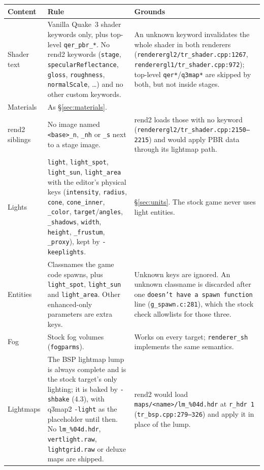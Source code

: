 \documentclass[11pt,a4paper]{article}
\begin{document}
\begin{tabular}{@{}p{}p{}p{}@{}}
\toprule
Content & Rule & Grounds \\
\midrule
Shader text & Vanilla Quake~3 shader keywords only, plus top-level \texttt{qer\_pbr\_*}. No rend2
  keywords (\texttt{stage}, \texttt{specularReflectance}, \texttt{gloss}, \texttt{roughness},
  \texttt{normalScale}, \ldots) and no other custom keywords. &
  An unknown keyword invalidates the whole shader in both renderers (\texttt{renderergl2/tr\_shader.cpp:1267},
  \texttt{renderergl1/tr\_shader.cpp:972}); top-level \texttt{qer*}/\texttt{q3map*} are skipped by
  both, but not inside stages. \\
Materials & As §\ref{sec:materials}. & \\
rend2 siblings & No image named \texttt{<base>\_n}, \texttt{\_nh} or \texttt{\_s} next to a stage
  image. &
  rend2 loads those with no keyword (\texttt{renderergl2/tr\_shader.cpp:2150--2215}) and would
  apply PBR data through its lightmap path. \\
Lights & \texttt{light}, \texttt{light\_spot}, \texttt{light\_sun}, \texttt{light\_area} with the
  editor's physical keys (\texttt{intensity}, \texttt{radius}, \texttt{cone}, \texttt{cone\_inner},
  \texttt{\_color}, \texttt{target}/\texttt{angles}, \texttt{\_shadows}, \texttt{width},
  \texttt{height}, \texttt{\_frustum}, \texttt{\_proxy}), kept by \texttt{-keeplights}. &
  §\ref{sec:units}. The stock game never uses light entities. \\
Entities & Classnames the game code spawns, plus \texttt{light\_spot}, \texttt{light\_sun} and
  \texttt{light\_area}. Other enhanced-only parameters are extra keys. & Unknown keys are ignored.
  An unknown classname is discarded after one \texttt{doesn't have a spawn function} line
  (\texttt{g\_spawn.c:281}), which the stock check allowlists for those three. \\
Fog & Stock fog volumes (\texttt{fogparms}). & Works on every target;
  \texttt{renderer\_sh} implements the same semantics. \\
Lightmaps & The BSP lightmap lump is always complete and is the stock target's only lighting; it
  is baked by \texttt{-shbake} (4.3), with q3map2 \texttt{-light} as the placeholder until then. No
  \texttt{lm\_\%04d.hdr}, \texttt{vertlight.raw}, \texttt{lightgrid.raw} or deluxe maps are shipped. &
  rend2 would load \texttt{maps/<name>/lm\_\%04d.hdr} at \texttt{r\_hdr 1}
  (\texttt{tr\_bsp.cpp:279--326}) and apply it in place of the lump. \\
\bottomrule
\end{tabular}
\end{document}
